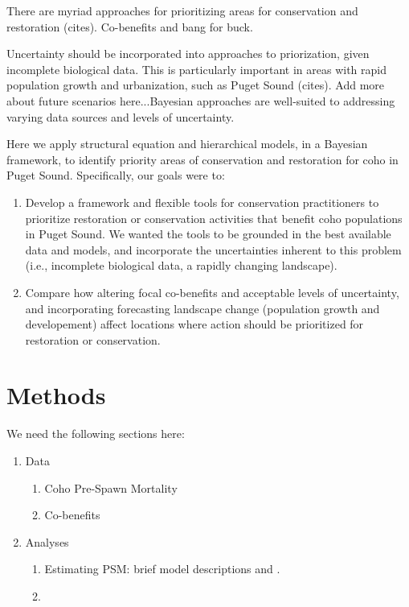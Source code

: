\documentclass{article}
\begin{document}
\par There are myriad approaches for prioritizing areas for conservation and restoration (cites). Co-benefits and bang for buck.  %
\par Uncertainty should be incorporated into approaches to priorization, given incomplete biological data. This is particularly important in areas with rapid population growth and urbanization, such as Puget Sound (cites). Add more about future scenarios here...Bayesian approaches are well-suited to addressing varying data sources and levels of uncertainty. 
\par Here we apply structural equation and hierarchical models, in a Bayesian framework, to identify priority areas of conservation and restoration for coho in Puget Sound. Specifically, our goals were to:
\begin{enumerate}
\item Develop a framework and flexible tools for conservation practitioners to prioritize restoration or conservation activities that benefit coho populations in Puget Sound. We wanted the tools to be grounded in the best available data and models, and incorporate the uncertainties inherent to this problem (i.e., incomplete biological data, a rapidly changing landscape).
\item Compare how altering focal co-benefits and acceptable levels of uncertainty, and incorporating forecasting landscape change (population growth and developement) affect  locations where action should be prioritized for restoration or conservation.
\end{enumerate}


\section*{Methods}
We need the following sections here:
\begin{enumerate}
\item Data
\begin{enumerate}
\item Coho Pre-Spawn Mortality
\item Co-benefits
\end{enumerate}

\item Analyses
\begin{enumerate}
\item Estimating PSM: brief model descriptions and \cite{feist2017}.
\item 
\end{enumerate}

\end{enumerate}
\end{document}

